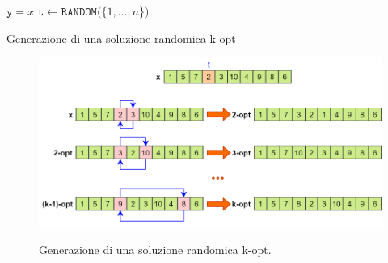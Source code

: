 \begin{algorithm}[H]
\DontPrintSemicolon
{}
\BlankLine
$\mathtt{y}=x$\;
$\mathtt{t \gets RANDOM(}\{1,...,n\}\mathtt{)}$\;
\BlankLine
 \caption{Generazione di una soluzione randomica k-opt}
\end{algorithm}
\begin{figure}[H] 
\begin{center} 
  \includegraphics[scale=0.4]{Images/k_opt_move}\\ 
  \caption{\footnotesize{Generazione di una soluzione randomica k-opt.}}
  \label{k_opt_move}
\end{center}
\end{figure}


